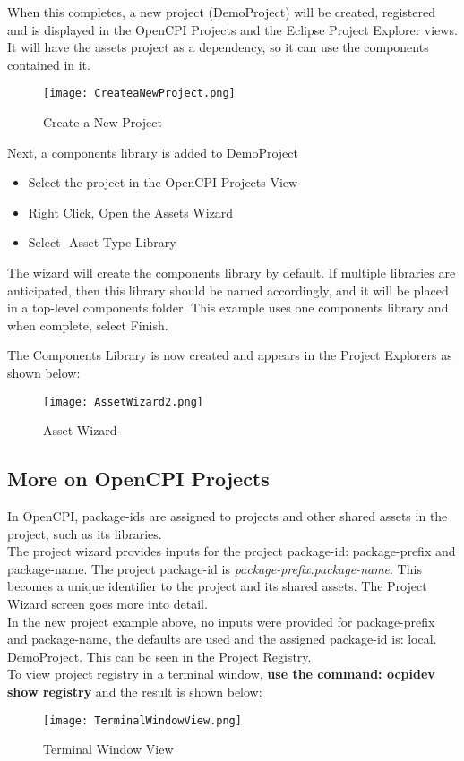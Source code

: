 When this completes, a new project (DemoProject) will be created, registered and is displayed in the OpenCPI Projects and the Eclipse Project Explorer views. It will have the assets project as a dependency, so it can use the components contained in it. \\

\begin{figure}[h!]
	\centering
	\caption{Create a New Project}\label{fig:CreateaNewProject}
	\texttt{[image: CreateaNewProject.png]}
 \end{figure}

Next, a components library is added to DemoProject
\begin{itemize}
\item	Select the project in the OpenCPI Projects View
\item	Right Click, Open the Assets Wizard
\item	Select- Asset Type Library
\end{itemize}
The wizard will create the components library by default. If multiple libraries are anticipated, then this library should be named accordingly, and it will be placed in a top-level components folder. This example uses one components library and when complete, select Finish.

The Components Library is now created and appears in the Project Explorers as shown below:

\begin{figure}[h!]
	\centering
	\caption{Asset Wizard}\label{fig:AssetWizard2}
	\texttt{[image: AssetWizard2.png]}
 \end{figure}
\subsection{More on OpenCPI Projects}
In OpenCPI, package-ids are assigned to projects and other shared assets in the project, such as its libraries.\\
 The project wizard provides inputs for the project package-id: package-prefix and package-name. The project package-id is \emph{package-prefix.package-name}. This becomes a unique identifier to the project and its shared assets. The Project Wizard screen goes more into detail.\\

In the new project example above, no inputs were provided for package-prefix and package-name, the defaults are used and the assigned package-id is: local. DemoProject. This can be seen in the Project Registry.\\ To view project registry in a terminal window, \textbf{use the command: ocpidev show registry} and the result is shown below:
\begin{figure}[h!]
	\centering
	\caption{Terminal Window View}\label{fig:TerminalWindowView}
	\texttt{[image: TerminalWindowView.png]}
 \end{figure}
